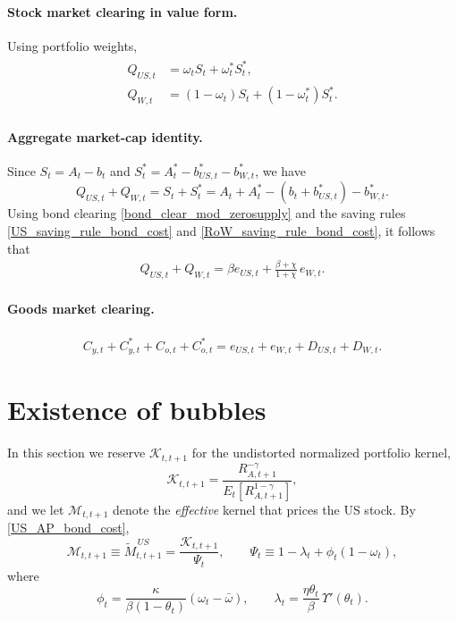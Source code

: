 \documentclass[12pt]{article}
\theoremstyle{plain}
\begin{document}
\paragraph{Stock market clearing in value form.}
Using portfolio weights,
\begin{align}\label{stock_weight_clear_mod}
\begin{split}
Q_{US,t} &= \omega_t S_t + \omega_t^* S_t^*,\\
Q_{W,t}  &= (1-\omega_t) S_t + (1-\omega_t^*) S_t^* .
\end{split}
\end{align}

\paragraph{Aggregate market-cap identity.}
Since $S_t=A_t-b_t$ and $S_t^*=A_t^*-b_{US,t}^*-b_{W,t}^*$, we have
\[
Q_{US,t}+Q_{W,t}=S_t+S_t^*=A_t+A_t^*-(b_t+b_{US,t}^*)-b_{W,t}^*.
\]
Using bond clearing \eqref{bond_clear_mod_zerosupply} and the saving rules
\eqref{US_saving_rule_bond_cost} and \eqref{RoW_saving_rule_bond_cost}, it follows that
\begin{align}\label{Qsum_identity_mod_zerosupply}
\boxed{
Q_{US,t}+Q_{W,t}
=
\beta e_{US,t}
+\frac{\beta+\chi}{1+\chi}\,e_{W,t}.
}
\end{align}

\paragraph{Goods market clearing.}
\begin{align}\label{goods_clear_mod}
C_{y,t}+C^*_{y,t}+C_{o,t}+C^*_{o,t}
=
e_{US,t}+e_{W,t}+D_{US,t}+D_{W,t}.
\end{align}



\section{Existence of bubbles}\label{sec:existence_of_bubbles}

In this section we reserve $\mathcal K_{t,t+1}$ for the undistorted normalized portfolio kernel,
\[
\mathcal K_{t,t+1}
=
\frac{R_{A,t+1}^{-\gamma}}{E_t\!\left[R_{A,t+1}^{1-\gamma}\right]},
\]
and we let $\mathcal M_{t,t+1}$ denote the \emph{effective} kernel that prices the US stock. By
\eqref{US_AP_bond_cost},
\begin{equation}\label{effective_US_kernel}
\mathcal M_{t,t+1}
\equiv
\widetilde M^{\,US}_{t,t+1}
=
\frac{\mathcal K_{t,t+1}}{\Psi_t},
\qquad
\Psi_t
\equiv
1-\lambda_t+\phi_t(1-\omega_t),
\end{equation}
where
\[
\phi_t=\frac{\kappa}{\beta(1-\theta_t)}(\omega_t-\bar\omega),
\qquad
\lambda_t=\frac{\eta\theta_t}{\beta}\,\Upsilon'(\theta_t).
\]
\end{document}
